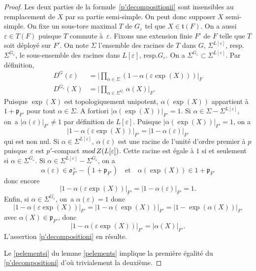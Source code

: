 \documentclass[11pt]{article}
\newcommand{\resp}{resp.\xspace}
\numberwithin{equation}{section}\providecommand{\og}{«\,}\providecommand{\fg}{\,»}
\let\epsilon\varepsilon
\newcommand{\quadet}{\quad\text{et}\quad}
\newcommand{\rmod}{\textup{mod}\,}
\newcommand{\fro}{\mathfrak{o}}
\newcommand{\frp}{\mathfrak{p}}
\newcommand{\frt}{\mathfrak{t}}
\theoremstyle{plain}
\theoremstyle{definition}
\begin{document}
\begin{proof}
Les deux parties de la formule~\eqref{p'decompositionii} sont insensibles au remplacement de $X$ par sa partie semi-simple. On peut donc supposer $X$ semi-simple. On fixe un sous-tore maximal $T$ de $G_{\epsilon}$ tel que $X\in \frt(F)$. On a aussi $\epsilon\in T(F)$ puisque $T$ commute à~$\epsilon$. Fixons une extension finie $F'$ de $F$ telle que $T$ soit déployé sur $F'$. On note $\Sigma$ l'ensemble des racines de $T$ dans $G$, $\Sigma^{L[\epsilon]}$, \resp $\Sigma^{G_{\epsilon}}$, le sous-ensemble des racines dans $L[\epsilon]$, \resp $G_{\epsilon}$. On a $\Sigma^{G_{\epsilon}}\subset \Sigma^{L[\epsilon]}$. Par définition,
\begin{align*}
D^G(\epsilon)&=\bigl\vert \textstyle\prod_{\alpha\in \Sigma}(1-\alpha(\epsilon \exp(X)))\bigr\vert _{F}
\\
D^{G_{\epsilon}}(X)&=\bigl\vert \textstyle\prod_{\alpha\in \Sigma^{G_{\epsilon}}}\alpha(X)\bigr\vert _{F}.
\end{align*}
Puisque $\exp(X)$ est topologiquement unipotent, $\alpha(\exp(X))$ appartient à $1+\frp_{F'}$ pour tout $\alpha\in \Sigma$. A fortiori $\vert \alpha(\exp(X))\vert _{F'}=1$.
Si $\alpha\in \Sigma-\Sigma^{L[\epsilon]}$, on~a $\vert \alpha(\epsilon)\vert _{F'}\neq1$ par définition de $L[\epsilon]$. Puisque $\vert \alpha(\exp(X))\vert _{F'}=1$, on a
\[
\vert 1-\alpha(\epsilon \exp(X))\vert _{F'}=\vert 1-\alpha(\epsilon)\vert _{F'}
\]
qui est non nul. Si $\alpha\in \Sigma^{L[\epsilon]}$, $\alpha(\epsilon)$ est une racine de l'unité d'ordre premier à $p$ puisque~$\epsilon$ est $p'$-compact $\rmod Z(L[\epsilon])$. Cette racine est égale à $1$ si et seulement si $\alpha\in \Sigma^{G_{\epsilon}}$. Si $\alpha\in \Sigma^{L[\epsilon]}-\Sigma^{G_{\epsilon}}$, on a
\[
\alpha(\epsilon)\in \fro_{F'}^{\times}-(1+\frp_{F'})\quadet\alpha(\exp(X))\in 1+\frp_{F'}
\]
donc encore
\[
\vert 1-\alpha(\epsilon \exp(X))\vert _{F'}=\vert 1-\alpha(\epsilon)\vert _{F'}=1.
\]
Enfin, si $\alpha\in \Sigma^{G_{\epsilon}}$, on~a $\alpha(\epsilon)=1$ donc
\[
\vert 1-\alpha (\epsilon \exp(X))\vert _{F'}=\vert 1-\alpha(\exp(X))\vert _{F'}=\vert 1-\exp(\alpha(X))\vert _{F'}
\]
avec $\alpha(X)\in \frp_{F'}$, donc
\[
\vert 1-\alpha (\epsilon \exp(X))\vert _{F'}=\vert \alpha(X)\vert _{F'}.
\]
L'assertion \eqref{p'decompositioni} en résulte.

Le \eqref{pelementsi} du lemme \ref{pelements} implique la première égalité du \eqref{p'decompositioni} d'où trivialement la deuxième.


\end{proof}
\end{document}
